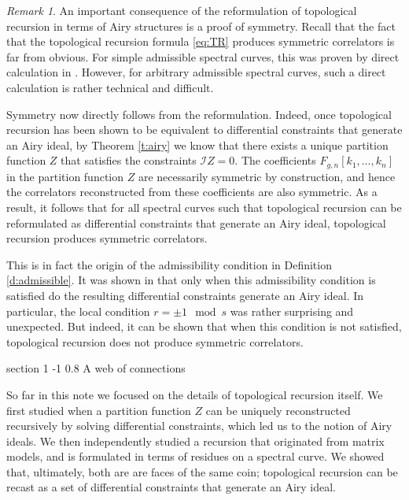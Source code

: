 \documentclass[reqno,oneside,11pt]{amsart}
\makeatletter
\theoremstyle{plain}
\theoremstyle{definition}
\theoremstyle{remark}
\newtheorem{remark}[theorem]{Remark}
\numberwithin{equation}{section}
\renewcommand{\section}{\@startsection
{section}%
{1}%
{\z@}%
{-1\baselineskip}%
{0.8\baselineskip}%
{\centering\scshape\large}} %
\makeatother
\begin{document}
\begin{remark}
An important consequence of the reformulation of topological recursion in terms of Airy structures is a proof of symmetry. Recall that the fact that the topological recursion formula \eqref{eq:TR} produces symmetric correlators is far from obvious. For simple admissible spectral curves, this was proven by direct calculation in \cite{EO07}. However, for arbitrary admissible spectral curves, such a direct calculation is rather technical and difficult.

Symmetry now directly follows from the reformulation. Indeed, once topological recursion has been shown to be equivalent to differential constraints that generate an Airy ideal, by Theorem \ref{t:airy} we know that there exists a unique partition function $Z$ that satisfies the constraints $\mathcal{I} Z = 0$. The coefficients $F_{g,n}[k_1,\ldots,k_n]$ in the partition function $Z$ are necessarily symmetric by construction, and hence the correlators reconstructed from these coefficients are also symmetric. As a result, it follows that for all spectral curves such that topological recursion can be reformulated as differential constraints that generate an Airy ideal, topological recursion produces symmetric correlators.

This is in fact the origin of the admissibility condition in Definition \ref{d:admissible}. It was shown in \cite{BBCCN18} that only when this admissibility condition is satisfied do the resulting differential constraints generate an Airy ideal. In particular, the local condition $r = \pm 1 \mod s$ was rather surprising and unexpected. But indeed, it can be shown that when this condition is not satisfied, topological recursion does not produce symmetric correlators.

\end{remark}

\section{A web of connections}
\label{s:connections}

So far in this note we focused on the details of topological recursion itself. We first studied when a partition function $Z$ can be uniquely reconstructed recursively by solving differential constraints, which led us to the notion of Airy ideals. We then independently studied a recursion that originated from matrix models, and is formulated in terms of residues on a spectral curve. We showed that, ultimately, both are are faces of the same coin; topological recursion can be recast as a set of differential constraints that generate an Airy ideal.
\end{document}
